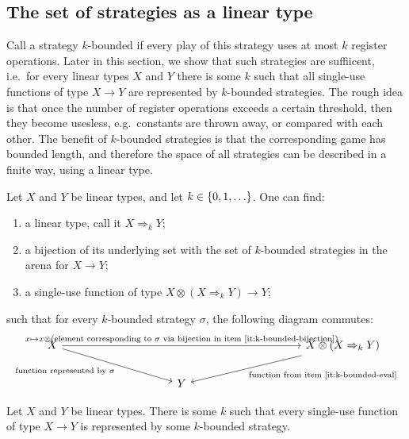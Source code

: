 \subsection{The set of strategies as a linear type}
Call a strategy $k$-bounded if every play of this strategy uses at most $k$ register operations. Later in this section, we show that such strategies are suffiicent, i.e.~for every linear types $X$ and $Y$ there is some $k$ such that all single-use functions of type $X \to Y$ are represented by $k$-bounded strategies.  The rough idea is that once the number of register operations exceeds a certain threshold, then they become usesless, e.g.~constants are thrown away, or  compared with each other. The benefit of $k$-bounded strategies is that the corresponding game has bounded length, and therefore the space of all strategies can be described in a finite way, using a linear type. 


\begin{lemma}\label{lem:linear-type-of-k-bounded-strategies}
    Let $X$ and $Y$ be linear types, and let $k \in \{0,1,\ldots\}$. One can find: 
    \begin{enumerate}
        \item \label{it:k-bounded-type} a linear type, call it $X \Rightarrow_k Y$;
        \item \label{it:k-bounded-bijection} a bijection of its underlying set with the set of $k$-bounded strategies in the arena for $X \to Y$;
        \item \label{it:k-bounded-eval} a single-use function of type $X \otimes (X \Rightarrow_k Y) \to Y$;\end{enumerate}
    such that for every $k$-bounded strategy $\sigma$, the following diagram commutes:
    \[
    \begin{tikzcd}[column sep=3.5cm]
    X  
    \ar[rr,"{x \mapsto x \otimes \text{(element corresponding to $\sigma$ via bijection in item~\ref{it:k-bounded-bijection}})}"]
    \ar[dr,"{\text{function represented by $\sigma$}}"']
    & & 
    X \otimes (X \Rightarrow_k Y)
    \ar[dl,"\text{function from item~\ref{it:k-bounded-eval}}"]
    \\
    & Y
    \end{tikzcd}
    \]    
\end{lemma}



\begin{lemma}\label{lem:bounded-k}
    Let $X$ and $Y$ be linear types. There is some $k$ such that every single-use function of type $X \to Y$ is represented by some $k$-bounded strategy. 
\end{lemma}

